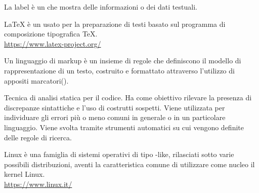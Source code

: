 La label è un  che mostra delle informazioni o dei dati testuali.

\LaTeX{} è un  usato per la preparazione di testi basato sul programma di composizione tipografica \TeX.\\
\url{https://www.latex-project.org/}

Un linguaggio di markup è un insieme di regole che definiscono il modello di rappresentazione di un testo, costruito e formattato attraverso l’utilizzo di appositi marcatori().

Tecnica di analisi statica per il codice. Ha come obiettivo rilevare la presenza di discrepanze sintattiche e l’uso di costrutti sospetti. Viene utilizzata per individuare gli errori più o meno comuni in generale o in un particolare linguaggio. Viene svolta tramite strumenti automatici su cui vengono definite delle regole di ricerca.

Linux è una famiglia di sistemi operativi di tipo -like, rilasciati sotto varie possibili distribuzioni, aventi la caratteristica comune di utilizzare come nucleo il kernel Linux.\\
\url{https://www.linux.it/}
\clearpage

